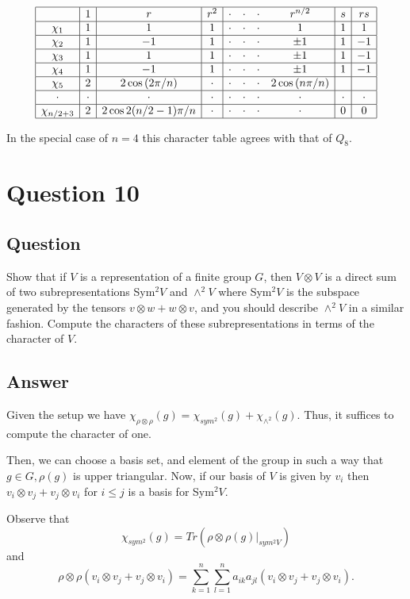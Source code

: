 \documentclass[11pt]{article}
\begin{document}
\[\begin{array}{|c|c|c|c|cccc|c|c|}
\hline
&1&r&r^2&\cdot&\cdot&\cdot&r^{n/2}&s&rs\\
\hline
\chi_1&1&1&1&\cdot&\cdot&\cdot&1&1&1\\
\hline
\chi_2&1&-1&1&\cdot&\cdot&\cdot&\pm1&1&-1\\
\hline
\chi_3&1&1&1&\cdot&\cdot&\cdot&\pm1&1&-1\\
\hline
\chi_4&1&-1&1&\cdot&\cdot&\cdot&\pm1&1&-1\\
\hline
\chi_{5}&2&2\cos{(2\pi/n)}&\cdot&\cdot&\cdot&\cdot&2 \cos{(n \pi /n)}&&\\
\hline
\cdot&\cdot&\cdot&\cdot&\cdot&\cdot&\cdot&\cdot&\cdot&\cdot\\
\hline
\chi_{n/2 + 3} & 2 & 2 \cos{2(n/2-1) \pi / n}&\cdot&\cdot&\cdot&\cdot&\cdot&0&0\\
\hline
\end{array}\]

In the special case of $n=4$ this character table agrees with that of $Q_8$.

\section{Question 10}
\subsection{Question}
Show that if $V$ is a representation of a finite group $G$, then $V\otimes V$ is a direct sum of two subrepresentations Sym$^2V$ and $\wedge^2 V$ where Sym$^2V$ is the subspace generated by the tensors $v \otimes w + w \otimes v$, and you should describe $\wedge^2V$ in a similar fashion. Compute the characters of these subrepresentations in terms of the character of $V$.
\subsection{Answer}
Given the setup we have $\chi_{\rho \otimes \rho}(g) = \chi_{sym^2}(g) + \chi_{\wedge^2}(g)$. Thus, it suffices to compute the character of one.

Then, we can choose a basis set, and element of the group in such a way that $g \in G, \rho(g)$ is upper triangular. Now, if our basis of $V$ is given by $v_i$ then $v_i \otimes v_j + v_j \otimes v_i$ for $i \leq j$ is a basis for Sym$^2 V$.

Observe that
\[ \chi_{sym^2}(g) = Tr(\rho \otimes \rho (g)|_{sym^2 V})\]
and
\[ \rho \otimes \rho (v_i \otimes v_j + v_j \otimes v_i) = \sum_{k=1}^n \sum_{l=1}^n a_{ik} a_{jl} (v_i \otimes v_j + v_j \otimes v_i).\]
\end{document}
